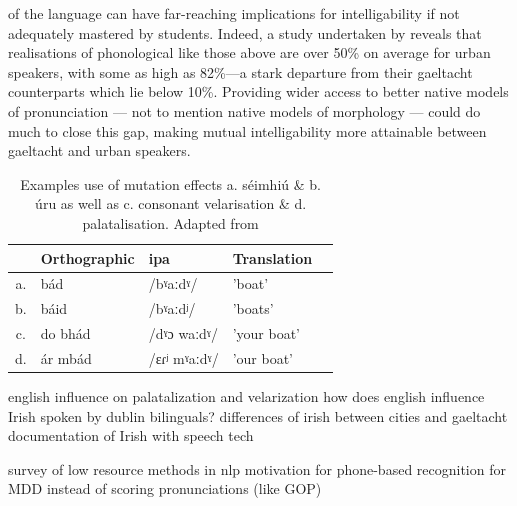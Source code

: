 \documentclass[thesis]{cluu}
\newcommand{\ipa}[1]{{\ipafont #1}}
\begin{document}
of the language can have far-reaching implications for intelligability if not adequately mastered by students. Indeed, a study undertaken by\textcite{broinNewUrbanIrish} reveals that realisations of phonological like those above are over 50\% on average for urban speakers, with some as high as 82\%---a stark departure from their gaeltacht counterparts which lie below 10\%. Providing wider access to better native models of pronunciation --- not to mention native models of morphology --- could do much to close this gap, making mutual intelligability more attainable between gaeltacht and urban speakers. 

\begin{table}[ht]
  \centering
  \caption{Examples use of mutation effects a. séimhiú \& b. úru as well as c. consonant velarisation \& d. palatalisation. Adapted from \textcite{nichasaideSPEECHTECHNOLOGYDOCUMENTATION}}
  \begin{tabular}{c|l|l|l|l}
     & Orthographic & \gls{ipa} & Translation \\
    \hline
    a. & bád & /\ipa{bˠaːdˠ}/ & 'boat' \\
    b. & báid & /\ipa{bˠaːdʲ}/ & 'boats' \\
    c. & do bhád & /\ipa{dˠɔ waːdˠ}/ & 'your boat'\\
    d. & ár mbád & /\ipa{ɛɾʲ mˠaːdˠ}/ & 'our boat'\\
  \end{tabular}
  \label{tab:sound_contrasts}
\end{table}

\textcite{gabrieleEnglishInfluenceL2} english influence on palatalization and velarization
\textcite{snesarevaPalatalizationDublinIrish2016} how does english influence Irish spoken by dublin bilinguals?
\textcite{broinNewUrbanIrish} differences of irish between cities and gaeltacht
\textcite{nichasaideSPEECHTECHNOLOGYDOCUMENTATION} documentation of Irish with speech tech

\textcite{magueresseLowresourceLanguagesReview2020} survey of low resource methods in \gls{nlp}
\textcite{wuTransformerBasedEndtoEnd2021} motivation for phone-based recognition for MDD instead of scoring pronunciations (like GOP)
\end{document}
